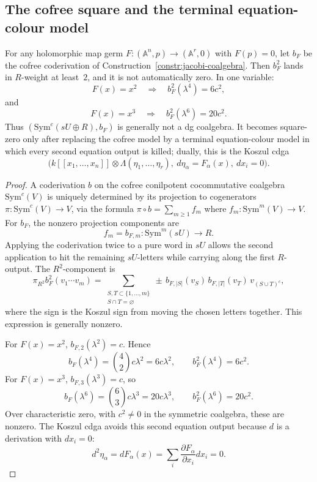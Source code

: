 \subsection{The cofree square and the terminal equation-colour model}

\begin{proposition}
\ClaimStatusProvedHere
\label{prop:jacobi-nilpotent}
For any holomorphic map germ $F\colon (\mathbb{A}^n, p) \to (\mathbb{A}^r, 0)$
with $F(p) = 0$, let $b_F$ be the cofree coderivation of
Construction~\textup{\ref{constr:jacobi-coalgebra}}. Then
$b_F^2$ lands in $R$-weight at least~$2$, and it is not automatically
zero. In one variable:
\[
F(x)=x^2 \quad\Longrightarrow\quad b_F^2(\lambda^4)=6c^2,
\]
and
\[
F(x)=x^3 \quad\Longrightarrow\quad b_F^2(\lambda^6)=20c^2.
\]
Thus \((\mathrm{Sym}^c(sU\oplus R),b_F)\) is generally not a dg
coalgebra. It becomes square-zero only after replacing the cofree
model by a terminal equation-colour model in which every second
equation output is killed; dually, this is the Koszul cdga
\[
\bigl(k[[x_1,\ldots,x_n]]\otimes\Lambda(\eta_1,\ldots,\eta_r),
\ d\eta_\alpha=F_\alpha(x),\ dx_i=0\bigr).
\]
\end{proposition}

\begin{proof}
A coderivation $b$ on the cofree conilpotent cocommutative coalgebra
$\mathrm{Sym}^c(V)$ is uniquely determined by its projection to cogenerators
$\pi \colon \mathrm{Sym}^c(V) \to V$, via the formula
$\pi \circ b = \sum_{m \geq 1} f_m$ where
$f_m \colon \mathrm{Sym}^m(V) \to V$.
For $b_F$, the nonzero projection components are
\[
f_m=b_{F,m}\colon \mathrm{Sym}^m(sU)\longrightarrow R.
\]
Applying the coderivation twice to a pure word in \(sU\) allows the
second application to hit the remaining \(sU\)-letters while carrying
along the first \(R\)-output. The \(R^2\)-component is
\begin{equation}\label{eq:b-squared-components}
\pi_{R^2} b_F^2(v_1\cdots v_m)
=
\sum_{\substack{S,T\subset\{1,\ldots,m\}\\ S\cap T=\varnothing}}
\pm\, b_{F,|S|}(v_S)\,b_{F,|T|}(v_T)\,v_{(S\cup T)^c},
\end{equation}
where the sign is the Koszul sign from moving the chosen letters
together. This expression is generally nonzero.

For \(F(x)=x^2\), \(b_{F,2}(\lambda^2)=c\). Hence
\[
b_F(\lambda^4)=\binom42 c\lambda^2=6c\lambda^2,
\qquad
b_F^2(\lambda^4)=6c^2.
\]
For \(F(x)=x^3\), \(b_{F,3}(\lambda^3)=c\), so
\[
b_F(\lambda^6)=\binom63 c\lambda^3=20c\lambda^3,
\qquad
b_F^2(\lambda^6)=20c^2.
\]
Over characteristic zero, with \(c^2\neq0\) in the symmetric
coalgebra, these are nonzero. The Koszul cdga avoids this second
equation output because \(d\) is a derivation with \(dx_i=0\):
\[
d^2\eta_\alpha=dF_\alpha(x)=\sum_i
\frac{\partial F_\alpha}{\partial x_i}dx_i=0.
\]
\end{proof}

